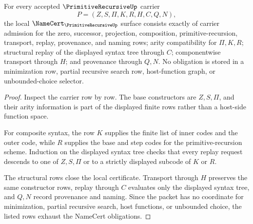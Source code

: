 \begin{theorem}
\label{thm:primitive-recursive-namecert-obligations}
For every accepted $\PrimitiveRecursiveUp$ carrier
$$
P=(Z,S,\Pi,K,R,H,C,Q,N),
$$
the local $\NameCert_{\PrimitiveRecursiveUp}$ surface consists exactly of carrier admission for the zero, successor, projection, composition, primitive-recursion, transport, replay, provenance, and naming rows; arity compatibility for $\Pi,K,R$; structural replay of the displayed syntax tree through $C$; componentwise transport through $H$; and provenance through $Q,N$. No obligation is stored in a minimization row, partial recursive search row, host-function graph, or unbounded-choice selector.
\end{theorem}
\begin{proof}
Inspect the carrier row by row. The base constructors are $Z,S,\Pi$, and their arity information is part of the displayed finite rows rather than a host-side function space.

For composite syntax, the row $K$ supplies the finite list of inner codes and the outer code, while $R$ supplies the base and step codes for the primitive-recursion scheme. Induction on the displayed syntax tree checks that every replay request descends to one of $Z,S,\Pi$ or to a strictly displayed subcode of $K$ or $R$.

The structural rows close the local certificate. Transport through $H$ preserves the same constructor rows, replay through $C$ evaluates only the displayed syntax tree, and $Q,N$ record provenance and naming. Since the packet has no coordinate for minimization, partial recursive search, host functions, or unbounded choice, the listed rows exhaust the NameCert obligations.
\end{proof}

